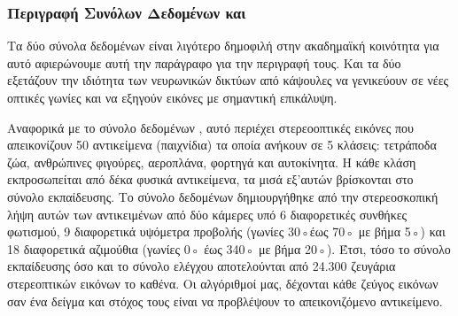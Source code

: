 \begin{table}[h]
    \begin{center}
        \end{center}
        \caption{\label{tab:exp_datasets} Πίνακας που συγκεντρώνει το καλύτερο μοντέλο και την απόδοσή του, για κάθε σύνολο δεδομένων.}
    \end{table}
    \subsubsection{Περιγραφή Συνόλων Δεδομένων  και }
    Τα δύο σύνολα δεδομένων είναι λιγότερο δημοφιλή στην ακαδημαϊκή κοινότητα για αυτό αφιερώνουμε αυτή την παράγραφο για την περιγραφή τους. Και τα δύο εξετάζουν την ιδιότητα των νευρωνικών δικτύων από κάψουλες να γενικεύουν σε νέες οπτικές γωνίες και να εξηγούν εικόνες με σημαντική επικάλυψη.\par

    Αναφορικά με το σύνολο δεδομένων , αυτό περιέχει στερεο\textendash οπτικές εικόνες που απεικονίζουν 50 αντικείμενα (παιχνίδια) τα οποία ανήκουν σε 5 κλάσεις: τετράποδα ζώα, ανθρώπινες φιγούρες, αεροπλάνα, φορτηγά και αυτοκίνητα. Η κάθε κλάση εκπροσωπείται από δέκα φυσικά αντικείμενα, τα μισά εξ'αυτών βρίσκονται στο σύνολο εκπαίδευσης. Το σύνολο δεδομένων δημιουργήθηκε από την στερεοσκοπική λήψη αυτών των αντικειμένων από δύο κάμερες υπό 6 διαφορετικές συνθήκες φωτισμού, 9 διαφορετικά υψόμετρα προβολής (γωνίες 30◦έως 70◦ με βήμα 5◦) και 18 διαφορετικά αζιμούθια (γωνίες 0◦ έως 340◦ με βήμα 20◦). Έτσι, τόσο το σύνολο εκπαίδευσης όσο και το σύνολο ελέγχου αποτελούνται από 24.300 ζευγάρια στερεο\textendash πτικών εικόνων το καθένα. Οι αλγόριθμοί μας, δέχονται κάθε ζεύγος εικόνων σαν ένα δείγμα και στόχος τους είναι να προβλέψουν το απεικονιζόμενο αντικείμενο.\par

